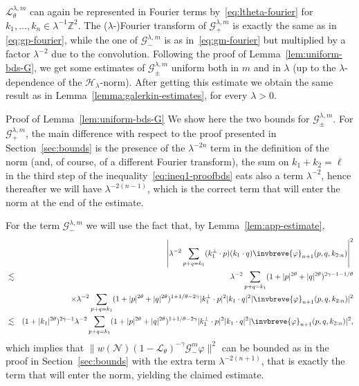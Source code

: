 \documentclass[10pt]{article}
\newenvironment{proof*}[1]{\noindent\textbf{#1\ }}{\hspace*{\fill}$\Box$\medskip}
\begin{document}
$\mathcal{L}_{\theta}^{\lambda, m}$ can again be represented in Fourier terms
by~{\eqref{eq:ltheta-fourier}} for $k_1, \ldots, k_n \in \lambda^{- 1}
\mathbb{Z}^2$. The ($\lambda$-)Fourier transform of $\mathcal{G}_+^{\lambda,
m}$ is exactly the same as in {\eqref{eq:gp-fourier}}, while the one of
$\mathcal{G}_-^{\lambda, m}$ is as in~{\eqref{eq:gm-fourier}} but multiplied
by a factor $\lambda^{- 2}$ due to the convolution. Following the proof of
Lemma~\ref{lem:uniform-bds-G}, we get some estimates of
$\mathcal{G}_{\pm}^{\lambda, m}$ uniform both in $m$ and in $\lambda$ (up to
the $\lambda$-dependence of the $\mathcal{H}_{\lambda}$-norm). After getting
this estimate we obtain the same result as in
Lemma~\ref{lemma:galerkin-estimates}, for every $\lambda > 0$.

\begin{proof*}{Proof of Lemma~\ref{lem:uniform-bds-G}}
  We show here the two bounds for $\mathcal{G}_{\pm}^{\lambda, m}$. For
  $\mathcal{G}_+^{\lambda, m}$, the main difference with respect to the proof
  presented in Section~\ref{sec:bounds} is the presence of the $\lambda^{- 2
  n}$ term in the definition of the norm (and, of course, of a different
  Fourier transform), the sum on $k_1 + k_2 = \ell$ in the third step of the
  inequality~{\eqref{eq:ineq1-proofbds}} eats also a term $\lambda^{- 2}$,
  hence thereafter we will have $\lambda^{- 2 (n - 1)}$, which is the correct
  term that will enter the norm at the end of the estimate.
  
  For the term $\mathcal{G}_-^{\lambda, m}$ we will use the fact that, by
  Lemma~\ref{lem:app-estimate},
  \begin{eqnarray*}
    &  & \left| \lambda^{- 2} \sum_{p + q = k_1} (k_1^{\perp} \cdot p)  (k_1
    \cdot q) \invbreve{\varphi}_{n + 1} (p, q, k_{2 : n}) \right|^2\\
    & \lesssim & \lambda^{- 2} \sum_{p + q = k_1} (1 + | p |^{2 \theta} + | q
    |^{2 \theta})^{2 \gamma - 1 - 1 / \theta}\\
    &  & \times \lambda^{- 2} \sum_{p + q = k_1} (1 + | p |^{2 \theta} + | q
    |^{2 \theta})^{1 + 1 / \theta - 2 \gamma} | k_1^{\perp} \cdot p |^2  | k_1
    \cdot q |^2 | \invbreve{\varphi}_{n + 1} (p, q, k_{2 : n}) |^2\\
    & \lesssim & (1 + | k_1 |^{2 \theta})^{2 \gamma - 1} \lambda^{- 2}
    \sum_{p + q = k_1} (1 + | p |^{2 \theta} + | q |^{2 \theta})^{1 + 1 /
    \theta - 2 \gamma} | k_1^{\perp} \cdot p |^2  | k_1 \cdot q |^2 |
    \invbreve{\varphi}_{n + 1} (p, q, k_{2 : n}) |^2,
  \end{eqnarray*}
  which implies that $\| w (\mathcal{N}) (1 -\mathcal{L}_{\theta})^{- \gamma}
  \mathcal{G}_-^m \varphi \|^2$ can be bounded as in the proof in
  Section~\ref{sec:bounds} with the extra term $\lambda^{- 2 (n + 1)}$, that
  is exactly the term that will enter the norm, yielding the claimed estimate.
\end{proof*}
\end{document}
